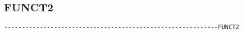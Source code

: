 
\subsection{FUNCT2}
\begin{verbatim}
------------------------------------------------------------FUNCT2
\end{verbatim}



